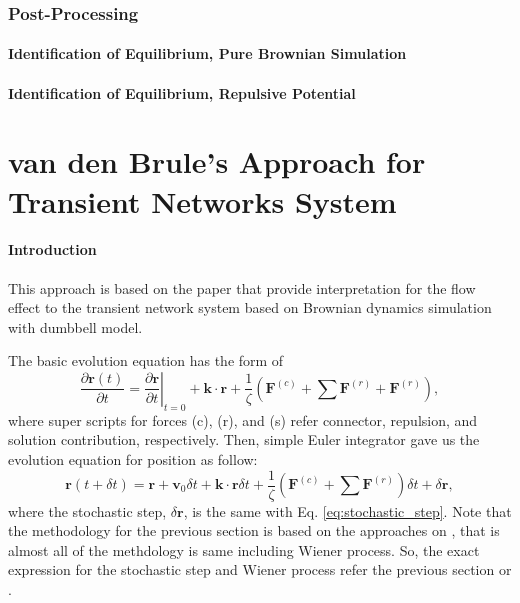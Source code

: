 \documentclass[10pt, a4paper]{article}
\begin{document}
\section{Post-Processing}
\subsection{Identification of Equilibrium, Pure Brownian Simulation}

\subsection{Identification of Equilibrium, Repulsive Potential}




\part{van den Brule's Approach for Transient Networks System}
\subsection{Introduction}
This approach is based on the paper \textcite{VandenBrule:1995fq} that provide interpretation for the flow effect to the transient network system based on Brownian dynamics simulation with dumbbell model.

The basic evolution equation has the form of
\begin{equation}
\frac{\partial \mathbf{r}(t)}{\partial t} = \left.\frac{\partial \mathbf{r}}{\partial t}\right\rvert_{t=0} + \mathbf{k}\cdot\mathbf{r} + \frac{1}{\zeta} \left(\mathbf{F}^{(c)} + \sum\mathbf{F}^{(r)} + \mathbf{F}^{(r)}\right),
\end{equation}
where super scripts for forces (c), (r), and (s) refer connector, repulsion, and solution contribution, respectively.  Then, simple Euler integrator \textcite{GREINER:1988cq} gave us the evolution equation for position as follow:
\begin{equation}
\mathbf{r}(t + \delta t) = \mathbf{r} + \mathbf{v}_0 \delta t + \mathbf{k}\cdot\mathbf{r} \delta t + \frac{1}{\zeta}\left(\mathbf{F}^{(c)} + \sum \mathbf{F}^{(r)}\right)\delta t + \delta \mathbf{r},\label{eq:update_position_Brule}
\end{equation}
where the stochastic step, $\delta \mathbf{r}$, is the same with Eq. \eqref{eq:stochastic_step}.
Note that the methodology for the previous section is based on the approaches on \textcite{VandenBrule:1995fq}, that is almost all of the methdology is same including Wiener process. So, the exact expression for the stochastic step and Wiener process refer the previous section or \textcite{VandenBrule:1995fq, GREINER:1988cq}.
\end{document}
